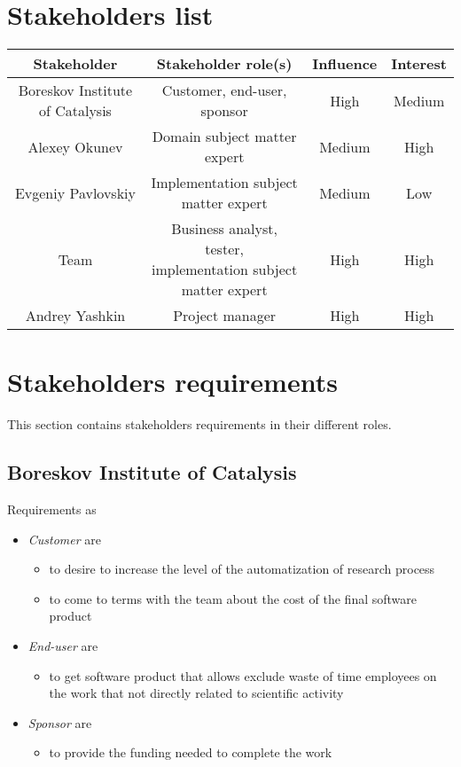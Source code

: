 \section{Stakeholders list}

\begin{tabular}{ | c | c | c | c | }
	\hline
	Stakeholder & Stakeholder role(s) & Influence & Interest \\ \hline
	Boreskov Institute of Catalysis & Customer, end-user, sponsor & High & Medium \\ \hline
	Alexey Okunev & Domain subject matter expert & Medium & High \\ \hline
	Evgeniy Pavlovskiy & Implementation subject matter expert & Medium & Low \\ \hline
	Team &  \specialcell{Business analyst, tester, \\ implementation subject matter expert} & High & High \\ \hline
	Andrey Yashkin & Project manager & High & High \\ \hline
\end{tabular}


\section{Stakeholders requirements}

This section contains stakeholders requirements in their different roles.

\subsection{Boreskov Institute of Catalysis}

Requirements as
\begin{itemize}
	\item \textit{Customer} are
	\begin{itemize}
		\item to desire to increase the level of the automatization of research process
		\item to come to terms with the team about the cost of the final software product
	\end{itemize}
	\item \textit{End-user} are
	\begin{itemize}
		\item  to get software product that allows exclude waste of time employees on the work
		that not directly related to scientific activity
	\end{itemize}
	\item \textit{Sponsor} are
	\begin{itemize}
		\item to provide the funding needed to complete the work
	\end{itemize}
\end{itemize}

